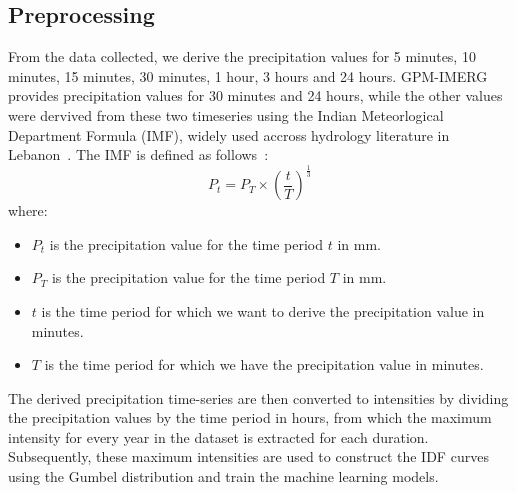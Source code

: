 \subsection{Preprocessing}
From the data collected, we derive the precipitation values for 5 minutes, 10 minutes, 15 minutes, 30 minutes, 1 hour, 3 hours and 24 hours. GPM-IMERG provides precipitation values for 30 minutes and 24 hours, while the other values were dervived from these two timeseries using the Indian Meteorlogical Department Formula (IMF), widely used accross hydrology literature in Lebanon~\cite{}.%
The IMF is defined as follows~\cite{}:
\begin{equation}
P_{t} = P_{T} \times {\left(\frac{t}{T}\right)}^{\frac{1}{3}}
\end{equation}
where:
\begin{itemize}
  \item $P_{t}$ is the precipitation value for the time period $t$ in mm.
  \item $P_{T}$ is the precipitation value for the time period $T$ in mm.
  \item $t$ is the time period for which we want to derive the precipitation value in minutes.
  \item $T$ is the time period for which we have the precipitation value in minutes.
\end{itemize}
The derived precipitation time-series are then converted to intensities by dividing the precipitation values by the time period in hours, from which the maximum intensity for every year in the dataset is extracted for each duration. Subsequently, these maximum intensities are used to construct the IDF curves using the Gumbel distribution and train the machine learning models.